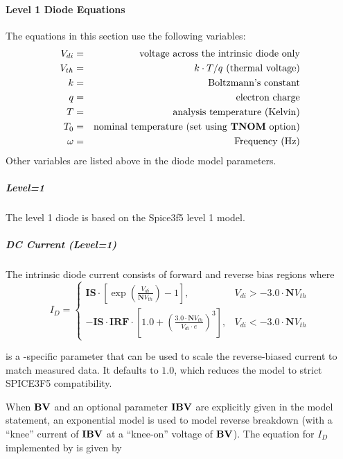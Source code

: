 \paragraph{Level 1 Diode Equations}

The equations in this section use the following variables:
\begin{eqnarray*}
V_{di} & = & \mbox{voltage across the intrinsic diode only} \\
V_{th} & = & \mbox{$k \cdot T/q$ (thermal voltage)}         \\
k      & = & \mbox{Boltzmann's constant}                    \\
q      & = & \mbox{electron charge}                         \\
T      & = & \mbox{analysis temperature (Kelvin)}           \\
T_{0}  & = & \mbox{nominal temperature (set using \textrm{\textbf{TNOM}}
option)} \\
\omega & = & \mbox{Frequency (Hz)}
\end{eqnarray*}
Other variables are listed above in the diode model parameters.

\subparagraph{Level=1}
The level 1 diode is based on the Spice3f5 level 1 model.

\subparagraph{DC Current (Level=1)}

The intrinsic diode current consists of forward and reverse bias regions where
\[
I_D = \left\{ \begin{array}{ll}
\mathbf{IS}\cdot\left[\exp \left(\frac{V_{di}}{\mathbf{N}V_{th}}\right) - 1
\right], & V_{di} > -3.0\cdot\mathbf{N}V_{th} \\
-\mathbf{IS}\cdot\mathbf{IRF}\cdot\left[1.0 + \left(\frac{3.0\cdot\mathbf{N}V_{th}}{V_{di}\cdot
e}\right)^3\right], & V_{di} < -3.0\cdot\mathbf{N}V_{th}
\end{array}
\right.
\]

 is a \Xyce{}-specific parameter that can be used to
scale the reverse-biased current to match measured data.  It defaults
to $1.0$, which reduces the model to strict SPICE3F5 compatibility.

When $\mathbf{BV}$ and an optional parameter $\mathbf{IBV}$ are explicitly given in the model
statement, an exponential model is used to model reverse breakdown (with a
``knee'' current of $\mathbf{IBV}$ at a ``knee-on'' voltage of $\mathbf{BV}$).  The equation
for $I_D$ implemented by \Xyce{} is given by

